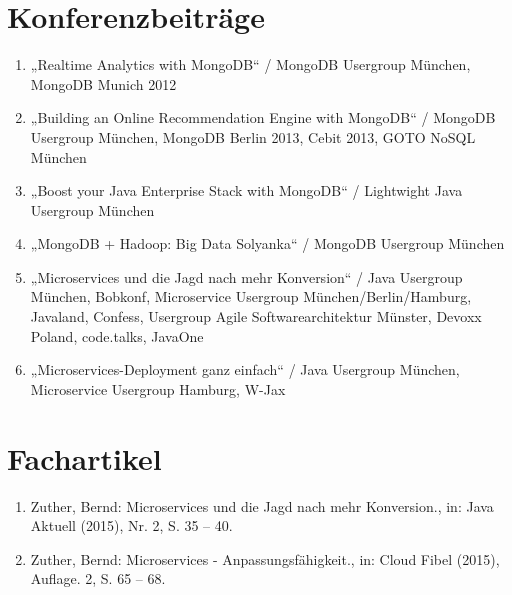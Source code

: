 \section*{Konferenzbeiträge}
\begin{enumerate}[label=,leftmargin=0cm,itemsep=10pt]
\item „Realtime Analytics with MongoDB“ / MongoDB Usergroup München, MongoDB Munich 2012
\item „Building an Online Recommendation Engine with MongoDB“ / MongoDB Usergroup München, MongoDB Berlin 2013, Cebit 2013, GOTO NoSQL München
\item „Boost your Java Enterprise Stack with MongoDB“ / Lightwight Java Usergroup München
\item „MongoDB + Hadoop: Big Data Solyanka“ / MongoDB Usergroup München
\item „Microservices und die Jagd nach mehr Konversion“ / Java Usergroup München, Bobkonf, Microservice  Usergroup München/Berlin/Hamburg, Javaland, Confess, Usergroup Agile Softwarearchitektur Münster, Devoxx Poland, code.talks, JavaOne
\item „Microservices-Deployment ganz einfach“ / Java Usergroup München, Microservice  Usergroup Hamburg, W-Jax
\end{enumerate}

\section*{Fachartikel}
\begin{enumerate}[label=,leftmargin=0cm,itemsep=10pt]
\item Zuther, Bernd: Microservices und die Jagd nach mehr Konversion., in: Java Aktuell (2015), Nr. 2, S. 35 – 40.
\item Zuther, Bernd: Microservices - Anpassungsfähigkeit., in: Cloud Fibel (2015), Auflage. 2, S. 65 – 68.
\end{enumerate}